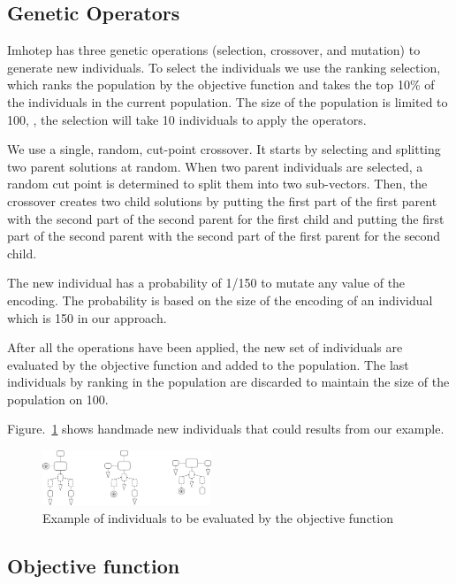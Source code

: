 \subsection{Genetic Operators}

Imhotep has three genetic operations (selection, crossover, and mutation) to generate new individuals. To select the individuals we use the ranking selection, which ranks the population by the objective function and takes the top 10\% of the individuals in the current population. The size of the population is limited to 100, \ie{}, the selection will take 10 individuals to apply the operators.

We use a single, random, cut-point crossover. It starts by selecting and splitting two parent solutions at random. When two parent individuals are selected, a random cut point is determined to split them into two sub-vectors.
Then, the crossover creates two child solutions by putting the first part of the first parent with the second part of the second parent for the first child and putting the first part of the second parent with the second part of the first parent for the second child.

The new individual has a probability of 1/150 to mutate any value of the encoding. The probability is based on the size of the encoding of an individual which is 150 in our approach.

After all the operations have been applied, the new set of individuals are evaluated by the objective function and added to the population. The last individuals by ranking in the population are discarded to maintain the size of the population on 100. 

Figure.~\ref{fig:candidates} shows handmade new individuals that could results from our example.

\begin{figure}[h]
    \centering
    \includegraphics[width=0.45\textwidth]{Figures/candidates.png}
    \caption{Example of individuals to be evaluated by the objective function}
    \label{fig:candidates}
\end{figure}

\subsection{Objective function}

